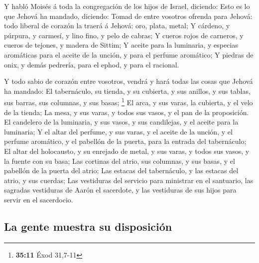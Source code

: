  Y habló Moisés á toda la congregación de los hijos de
Israel, diciendo: Esto es lo que Jehová ha mandado, diciendo:
 Tomad de entre vosotros ofrenda para Jehová: todo liberal
de corazón la traerá á Jehová: oro, plata, metal;  Y
cárdeno, y púrpura, y carmesí, y lino fino, y pelo de cabras;
 Y cueros rojos de carneros, y cueros de tejones, y madera
de Sittim;  Y aceite para la luminaria, y especias
aromáticas para el aceite de la unción, y para el perfume aromático;
 Y piedras de onix, y demás pedrería, para el ephod, y para
el racional.

 Y todo sabio de corazón entre vosotros, vendrá y hará
todas las cosas que Jehová ha mandado:  El tabernáculo, su
tienda, y su cubierta, y sus anillos, y sus tablas, sus barras, sus
columnas, y sus basas; \footnote{\textbf{35:11} Éxod 31,7-11}
 El arca, y sus varas, la cubierta, y el velo de la tienda;
 La mesa, y sus varas, y todos sus vasos, y el pan de la
proposición.  El candelero de la luminaria, y sus vasos, y
sus candilejas, y el aceite para la luminaria;  Y el altar
del perfume, y sus varas, y el aceite de la unción, y el perfume
aromático, y el pabellón de la puerta, para la entrada del tabernáculo;
 El altar del holocausto, y su enrejado de metal, y sus
varas, y todos sus vasos, y la fuente con su basa;  Las
cortinas del atrio, sus columnas, y sus basas, y el pabellón de la
puerta del atrio;  Las estacas del tabernáculo, y las
estacas del atrio, y sus cuerdas;  Las vestiduras del
servicio para ministrar en el santuario, las sagradas vestiduras de
Aarón el sacerdote, y las vestiduras de sus hijos para servir en el
sacerdocio.

\hypertarget{la-gente-muestra-su-disposiciuxf3n}{%
\subsection{La gente muestra su
disposición}\label{la-gente-muestra-su-disposiciuxf3n}}

